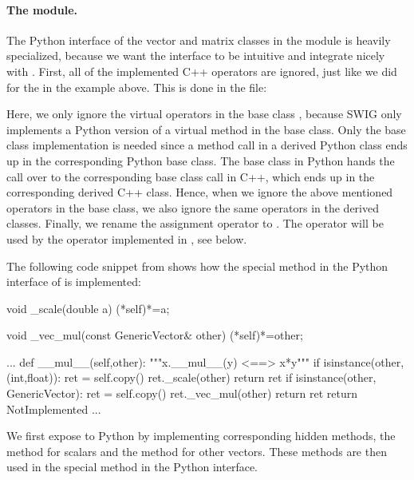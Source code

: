 \paragraph{The  module.}
The Python interface of the vector and matrix classes in the 
module is heavily specialized, because we want the interface to be
intuitive and integrate nicely with \numpy.  First, all of the implemented
C++ operators are ignored, just like we did for the  in
the  example above. This is done in the  file:\vspace*{3pt}
\begin{swigcode}

\end{swigcode}

\vspace*{5pt}\enlargethispage{-12pt}

\noindent Here, we only ignore the virtual operators in the base class
, because SWIG only implements a Python version of a
virtual method in the base class.  Only the base class implementation
is needed since a method call in a derived Python class ends up in
the corresponding Python base class. The base class in Python hands
the call over to the corresponding base class call in C++, which ends
up in the corresponding derived C++ class.  Hence, when we ignore the
above mentioned operators in the base class, we also ignore the same
operators in the derived classes.  Finally, we rename the assignment
operator to . The  operator will be used by
the  operator implemented in , see below.


The following code snippet from  shows how the special
method  in the Python interface of 
is implemented:
\begin{swigcode}
  void _scale(double a)
  {(*self)*=a;}

  void _vec_mul(const GenericVector& other)
  {(*self)*=other;}

   ...
    def __mul__(self,other):
        """x.__mul__(y) <==> x*y"""
        if isinstance(other,(int,float)):
            ret = self.copy()
            ret._scale(other)
            return ret
        if isinstance(other, GenericVector):
            ret = self.copy()
            ret._vec_mul(other)
            return ret
        return NotImplemented
    ...
\end{swigcode}
We first expose  to Python by implementing
corresponding hidden methods, the  method for scalars and
the  method for other vectors. These methods are then
used in the  special method in the Python interface.

